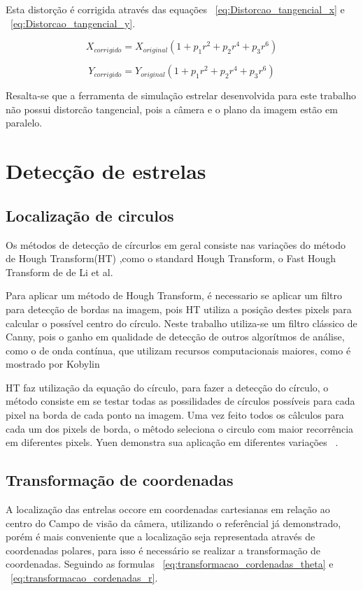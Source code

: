 Esta distorção é corrigida através das equações ~\ref{eq:Distorcao_tangencial_x} e ~\ref{eq:Distorcao_tangencial_y}.

\begin{equation}
	X_{corrigido} = X_{original} (1 + p_1 r^2 + p_2 r^4 + p_3 r^6)
	\label{eq:Distorcao_tangencial_x}
\end{equation}

\begin{equation}
	Y_{corrigido} = Y_{original} (1 + p_1 r^2 + p_2 r^4 + p_3 r^6)
	\label{eq:Distorcao_tangencial_y}
\end{equation}

Resalta-se que a ferramenta de simulação estrelar desenvolvida para este trabalho não possui distorcão tangencial, pois a câmera e o plano da imagem estão em paralelo.

\section{Detecção de estrelas}
\subsection{Localização de circulos}
Os métodos de detecção de círcurlos em geral consiste nas variações do método de Hough Transform(HT) ,como o standard Hough Transform, o Fast Hough Transform de de Li et al.

Para aplicar um método de Hough Transform, é necessario se aplicar um filtro para detecção de bordas na imagem, pois HT utiliza a posição destes pixels para calcular o possível centro do círculo.
Neste trabalho utiliza-se um filtro clássico de Canny, pois o ganho em qualidade de detecção de outros algorítmos de análise, como o de onda contínua, que utilizam recursos computacionais maiores, como é mostrado por Kobylin ~\cite[]{kobylin2014comparison}

HT faz utilização da equação do círculo, para fazer a detecção do círculo, o método consiste em se testar todas as possilidades de círculos possíveis para cada pixel na borda de cada ponto na imagem.
Uma vez feito todos os câlculos para cada um dos pixels de borda, o mêtodo seleciona o circulo com maior recorrência em diferentes pixels. Yuen demonstra sua aplicação em diferentes variações ~\cite[]{YUEN199071}.

\subsection{Transformação de coordenadas}
A localização das entrelas occore em coordenadas cartesianas em relação ao centro do Campo de visão da câmera, utilizando o referêncial já demonstrado, porém é mais conveniente que a localização seja representada através de coordenadas polares, para isso é necessário se realizar a transformação de coordenadas.
Seguindo as formulas  ~\ref{eq:transformacao_cordenadas_theta} e ~\ref{eq:transformacao_cordenadas_r}.

